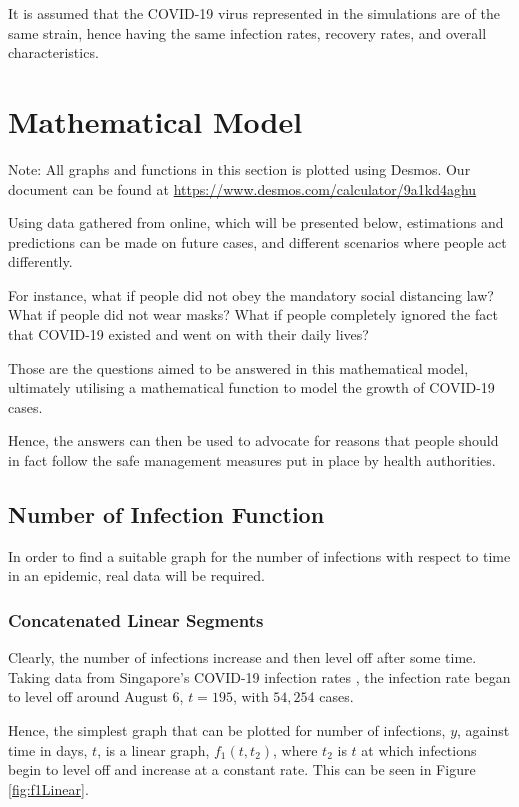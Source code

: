 \documentclass[a4paper,titlepage]{article}
\begin{document}
It is assumed that the COVID-19 virus represented in the simulations are of the same strain, hence having the same infection rates, recovery rates, and overall characteristics.

\pagebreak
\section{Mathematical Model}

Note: All graphs and functions in this section is plotted using Desmos. Our document can be found at \url{https://www.desmos.com/calculator/9a1kd4aghu}

Using data gathered from online, which will be presented below, estimations and predictions can be made on future cases, and different scenarios where people act differently. 

For instance, what if people did not obey the mandatory social distancing law? What if people did not wear masks? What if people completely ignored the fact that COVID-19 existed and went on with their daily lives?

Those are the questions aimed to be answered in this mathematical model, ultimately utilising a mathematical function to model the growth of COVID-19 cases.

Hence, the answers can then be used to advocate for reasons that people should in fact follow the safe management measures put in place by health authorities.

\subsection{Number of Infection Function}

In order to find a suitable graph for the number of infections with respect to time in an epidemic, real data will be required.

\subsubsection{Concatenated Linear Segments}

Clearly, the number of infections increase and then level off after some time. Taking data from Singapore's COVID-19 infection rates \cite{covidsg_who_2021}, the infection rate began to level off around August 6, $t=195$, with $54,254$ cases.

Hence, the simplest graph that can be plotted for number of infections, $y$, against time in days, $t$, is a linear graph, $f_1(t,t_2)$, where $t_2$ is $t$ at which infections begin to level off and increase at a constant rate. This can be seen in Figure \ref{fig:f1Linear}.
\end{document}
